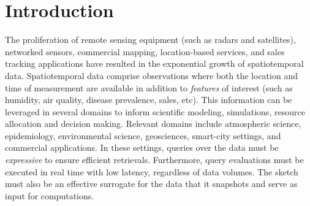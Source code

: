 \section{Introduction}
\label{sec:introduction}
The proliferation of remote sensing equipment (such as radars and satellites), networked sensors, commercial mapping, location-based services, and sales tracking applications have resulted in the exponential growth of spatiotemporal data. Spatiotemporal data comprise observations where both the location and time of measurement are available in addition to \emph{features} of interest (such as humidity, air quality, disease prevalence, sales, etc). This information can be leveraged in several domains to inform scientific modeling, simulations, resource allocation and decision making. Relevant domains include atmospheric science, epidemiology, environmental science, geosciences, smart-city settings, and commercial applications. In these settings, queries over the data must be \emph{expressive} to ensure efficient retrievals. Furthermore, query evaluations must be executed in real time with low latency, regardless of data volumes.
The sketch must also be an effective surrogate for the data that it snapshots and serve as input for computations.

